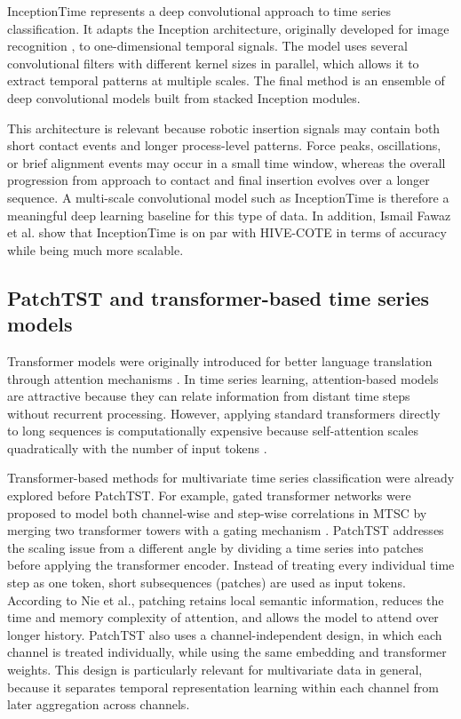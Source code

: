 InceptionTime represents a deep convolutional approach to time series classification. It adapts the Inception architecture, originally developed for image recognition \cite{szegedyGoingDeeperConvolutions2014}, to one-dimensional temporal signals. The model uses several convolutional filters with different kernel sizes in parallel, which allows it to extract temporal patterns at multiple scales. The final method is an ensemble of deep convolutional models built from stacked Inception modules.

This architecture is relevant because robotic insertion signals may contain both short contact events and longer process-level patterns. Force peaks, oscillations, or brief alignment events may occur in a small time window, whereas the overall progression from approach to contact and final insertion evolves over a longer sequence. A multi-scale convolutional model such as InceptionTime is therefore a meaningful deep learning baseline for this type of data. In addition, Ismail Fawaz et al. show that InceptionTime is on par with HIVE-COTE in terms of accuracy while being much more scalable.

\subsection{PatchTST \cite{nieTimeSeriesWorth2023b} and transformer-based time series models}

Transformer models were originally introduced for better language translation through attention mechanisms \cite{vaswaniAttentionAllYou2017}. In time series learning, attention-based models are attractive because they can relate information from distant time steps without recurrent processing. However, applying standard transformers directly to long sequences is computationally expensive because self-attention scales quadratically with the number of input tokens \cite{vaswaniAttentionAllYou2017,nieTimeSeriesWorth2023b}.

Transformer-based methods for multivariate time series classification were already explored before PatchTST. For example, gated transformer networks were proposed to model both channel-wise and step-wise correlations in MTSC by merging two transformer towers with a gating mechanism \cite{liuGatedTransformerNetworks2021}. PatchTST addresses the scaling issue from a different angle by dividing a time series into patches before applying the transformer encoder. Instead of treating every individual time step as one token, short subsequences (patches) are used as input tokens. According to Nie et al., patching retains local semantic information, reduces the time and memory complexity of attention, and allows the model to attend over longer history. PatchTST also uses a channel-independent design, in which each channel is treated individually, while using the same embedding and transformer weights. This design is particularly relevant for multivariate data in general, because it separates temporal representation learning within each channel from later aggregation across channels.

